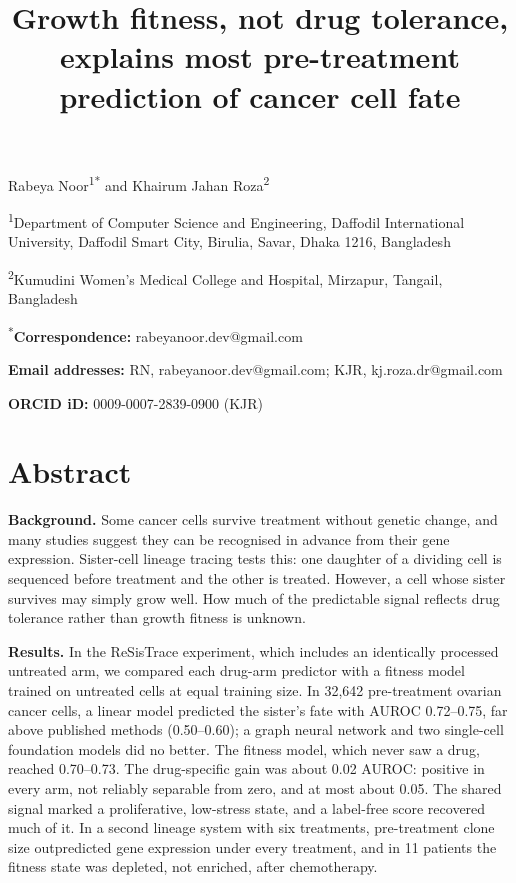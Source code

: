 \documentclass[11pt,a4paper]{article}
\date{}
\begin{document}
\title{Growth fitness, not drug tolerance, explains most pre-treatment prediction of cancer cell fate}
\maketitle

Rabeya Noor\textsuperscript{1*} and Khairum Jahan Roza\textsuperscript{2}

\textsuperscript{1}Department of Computer Science and Engineering, Daffodil International University, Daffodil Smart City, Birulia, Savar, Dhaka 1216, Bangladesh

\textsuperscript{2}Kumudini Women's Medical College and Hospital, Mirzapur, Tangail, Bangladesh

\textsuperscript{*}\textbf{Correspondence:} rabeyanoor.dev@gmail.com

\textbf{Email addresses:} RN, rabeyanoor.dev@gmail.com; KJR, kj.roza.dr@gmail.com

\textbf{ORCID iD:} 0009-0007-2839-0900 (KJR)

\section*{Abstract}

\textbf{Background.} Some cancer cells survive treatment without genetic change, and many studies suggest they can be recognised in advance from their gene expression. Sister-cell lineage tracing tests this: one daughter of a dividing cell is sequenced before treatment and the other is treated. However, a cell whose sister survives may simply grow well. How much of the predictable signal reflects drug tolerance rather than growth fitness is unknown.

\textbf{Results.} In the ReSisTrace experiment, which includes an identically processed untreated arm, we compared each drug-arm predictor with a fitness model trained on untreated cells at equal training size. In 32,642 pre-treatment ovarian cancer cells, a linear model predicted the sister's fate with AUROC 0.72--0.75, far above published methods (0.50--0.60); a graph neural network and two single-cell foundation models did no better. The fitness model, which never saw a drug, reached 0.70--0.73. The drug-specific gain was about 0.02 AUROC: positive in every arm, not reliably separable from zero, and at most about 0.05. The shared signal marked a proliferative, low-stress state, and a label-free score recovered much of it. In a second lineage system with six treatments, pre-treatment clone size outpredicted gene expression under every treatment, and in 11 patients the fitness state was depleted, not enriched, after chemotherapy.
\end{document}
